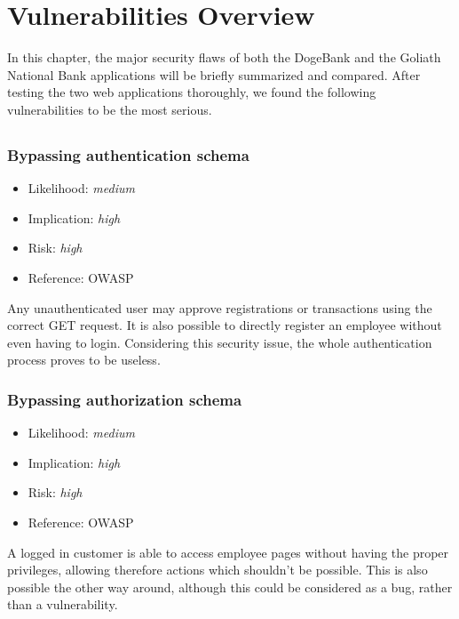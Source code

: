 \chapter{Vulnerabilities Overview}\label{chapter:vulnerabilities_overview}
In this chapter, the major security flaws of both the DogeBank and the Goliath National Bank applications will be briefly summarized and compared.\newline
After testing the two web applications thoroughly, we found the following vulnerabilities to be the most serious.
\section{\doge}
\subsection{Bypassing authentication schema} \label{over:bypassing}
\begin{itemize}
	\item Likelihood: \textit{medium}
	\item Implication: \textit{high}
	\item Risk: \textit{high}
	\item Reference: OWASP 
\end{itemize}
Any unauthenticated user may approve registrations or transactions using the correct GET request. It is also possible to directly register an employee without even having to login. Considering this security issue, the whole authentication process proves to be useless.

\subsection{Bypassing authorization schema} \label{over:privilege}
\begin{itemize}
	\item Likelihood: \textit{medium}
	\item Implication: \textit{high}
	\item Risk: \textit{high}
	\item Reference: OWASP 
\end{itemize}
A logged in customer is able to access employee pages without having the proper privileges, allowing therefore actions which shouldn't be possible. This is also possible the other way around, although this could be considered as a bug, rather than a vulnerability.


